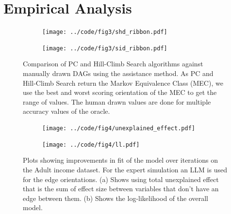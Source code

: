 \documentclass{uai2025} %
\begin{document}

\section{Empirical Analysis}
\label{sec:empirical}

\begin{figure}
	\centering
	\begin{subfigure}{0.5\textwidth}
		\centering
		\texttt{[image: ../code/fig3/shd\_ribbon.pdf]}
		\caption{}
	\end{subfigure}
	\begin{subfigure}{0.5\textwidth}
		\centering
		\texttt{[image: ../code/fig3/sid\_ribbon.pdf]}
		\caption{}
	\end{subfigure}
	\caption{Comparison of PC and Hill-Climb Search algorithms against
		manually drawn DAGs using the assistance method. As PC and
		Hill-Climb Search return the Markov Equivalence Class (MEC), we
		use the best and worst scoring orientation of the MEC to get
		the range of values. The human drawn values are done for
		multiple accuracy values of the oracle.}
\end{figure}

\begin{figure}
	\begin{subfigure}{0.25\textwidth}
		\centering
		\texttt{[image: ../code/fig4/unexplained\_effect.pdf]}
		\caption{}
	\end{subfigure}%
	\begin{subfigure}{0.25\textwidth}
		\centering
		\texttt{[image: ../code/fig4/ll.pdf]}
		\caption{}
	\end{subfigure}
	\caption{Plots showing improvements in fit of the model over iterations
	on the Adult income dataset. For the expert simulation an LLM is used
	for the edge orientations. (a) Shows using total unexplained effect that is the
	sum of effect size between variables that don't have an edge between them. (b)
	Shows the log-likelihood of the overall model.
	}
\end{figure}
\end{document}
